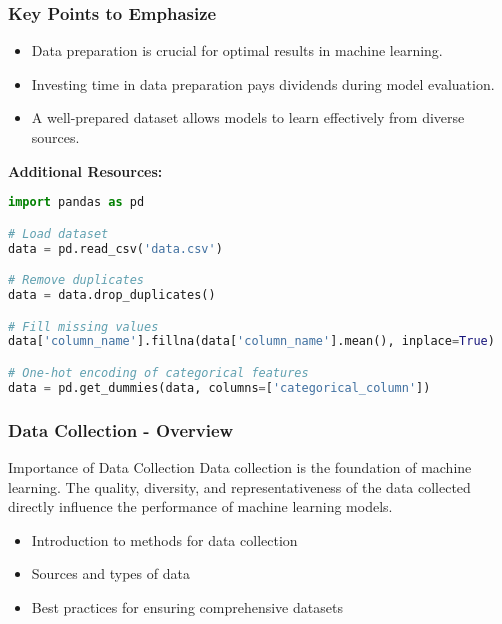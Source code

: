 \documentclass[aspectratio=169]{beamer}
\begin{document}
\begin{frame}[fragile]
    \frametitle{Key Points to Emphasize}
    \begin{itemize}
        \item Data preparation is crucial for optimal results in machine learning.
        \item Investing time in data preparation pays dividends during model evaluation.
        \item A well-prepared dataset allows models to learn effectively from diverse sources.
    \end{itemize}
    
    \textbf{Additional Resources:}
    \begin{lstlisting}[language=Python]
import pandas as pd

# Load dataset
data = pd.read_csv('data.csv')

# Remove duplicates
data = data.drop_duplicates()

# Fill missing values
data['column_name'].fillna(data['column_name'].mean(), inplace=True)

# One-hot encoding of categorical features
data = pd.get_dummies(data, columns=['categorical_column'])
    \end{lstlisting}
\end{frame}

\begin{frame}[fragile]
    \frametitle{Data Collection - Overview}
    \begin{block}{Importance of Data Collection}
        Data collection is the foundation of machine learning. The quality, diversity, and representativeness of the data collected directly influence the performance of machine learning models.
    \end{block}
    
    \begin{itemize}
        \item Introduction to methods for data collection
        \item Sources and types of data
        \item Best practices for ensuring comprehensive datasets
    \end{itemize}
\end{frame}
\end{document}
